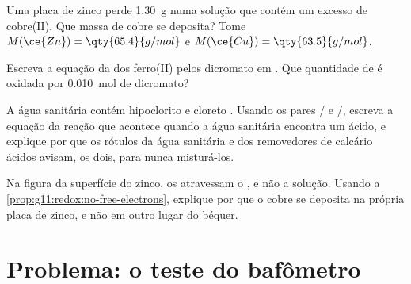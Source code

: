 \begin{exercise}[$\star\star\star$]\label{exo:g11:redox:12}
Uma placa de zinco perde \qty{1.30}{g} numa solução que contém um
excesso de  cobre(II). Que massa de cobre se deposita? Tome
$M(\ce{Zn}) = \qty{65.4}{g/mol}$ e $M(\ce{Cu}) = \qty{63.5}{g/mol}$.
\end{exercise}

\begin{exercise}[$\star\star\star$]\label{exo:g11:redox:13}
Escreva a equação da  dos  ferro(II) pelos  dicromato em
. Que quantidade de  é oxidada por
\qty{0.010}{mol} de  dicromato?
\end{exercise}

\begin{exercise}[$\star\star\star$]\label{exo:g11:redox:14}
A água sanitária contém  hipoclorito  e  cloreto
. Usando os pares / e /,
escreva a equação da reação que acontece quando a água sanitária
encontra um ácido, e explique por que os rótulos da água sanitária e dos
removedores de calcário ácidos avisam, os dois, para nunca misturá-los.
\end{exercise}

\begin{exercise}[$\star\star\star$]\label{exo:g11:redox:15}
Na figura da superfície do zinco, os  atravessam o , e não
a solução. Usando a \cref{prop:g11:redox:no-free-electrons}, explique por
que o cobre se deposita na própria placa de zinco, e não em outro lugar
do béquer.
\end{exercise}
\section{Problema: o teste do bafômetro}

